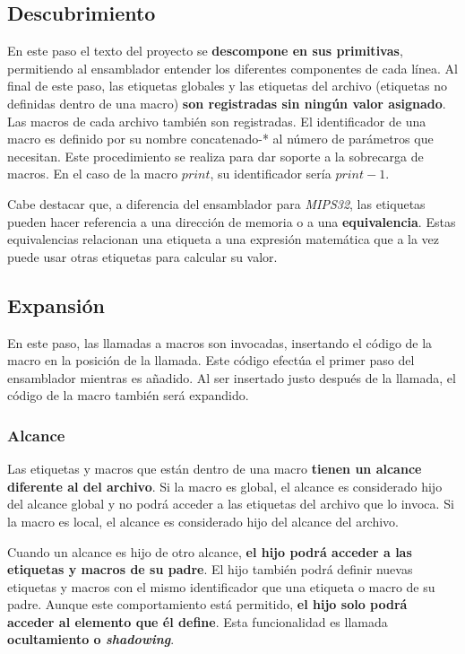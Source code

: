 \subsection{Descubrimiento}\label{subsec:descubrimiento}

En este paso el texto del proyecto se \textbf{descompone en sus primitivas},
permitiendo al ensamblador entender los diferentes componentes de cada línea.
Al final de este paso, las etiquetas globales y las etiquetas del archivo
(etiquetas no definidas dentro de una macro) \textbf{son registradas sin
ningún valor asignado}.
Las macros de cada archivo también son registradas.
El identificador de una macro es definido por su nombre concatenado-*
al número de parámetros que necesitan.
Este procedimiento se realiza para dar soporte a la sobrecarga de macros.
En el caso de la macro $print$, su identificador sería $print-1$.

Cabe destacar que, a diferencia del ensamblador para \textit{MIPS32},
las etiquetas pueden hacer referencia a una dirección de memoria
o a una \textbf{equivalencia}.
Estas equivalencias relacionan una etiqueta a una expresión matemática
que a la vez puede usar otras etiquetas para calcular su valor.

\subsection{Expansión}\label{subsec:expansion}

En este paso, las llamadas a macros son invocadas,
insertando el código de la macro en la posición de la llamada.
Este código efectúa el primer paso del ensamblador mientras es añadido.
Al ser insertado justo después de la llamada, el código de la macro
también será expandido.

\subsubsection{Alcance}\label{subsubsec:alcance}

Las etiquetas y macros que están dentro de una macro
\textbf{tienen un alcance diferente al del archivo}.
Si la macro es global, el alcance es considerado hijo del alcance global
y no podrá acceder a las etiquetas del archivo que lo invoca.
Si la macro es local, el alcance es considerado hijo del alcance del archivo.

Cuando un alcance es hijo de otro alcance,
\textbf{el hijo podrá acceder a las etiquetas y macros de su padre}.
El hijo también podrá definir nuevas etiquetas y macros con el mismo
identificador que una etiqueta o macro de su padre.
Aunque este comportamiento está permitido, \textbf{el hijo solo podrá acceder
al elemento que él define}.
Esta funcionalidad es llamada \textbf{ocultamiento o \textit{shadowing}}.

